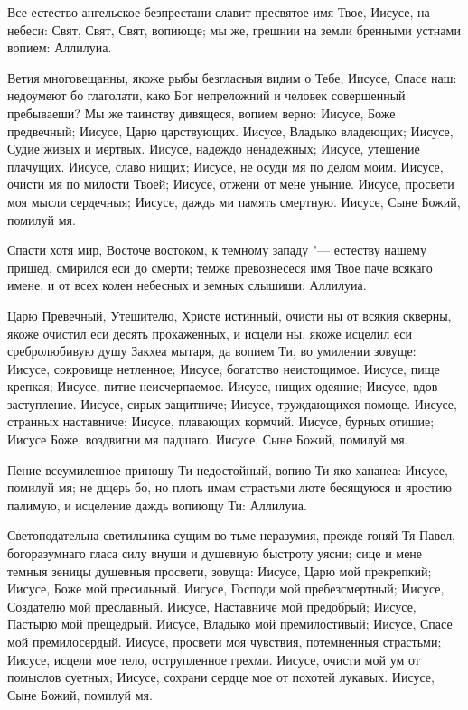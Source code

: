 \begin{mymulticols}

Все
естество ангельское безпрестани славит пресвятое имя Твое, Иисусе, на небеси: Свят, Свят, Свят, вопиюще; мы же, грешнии на земли бренными устнами вопием: Аллилуиа.


Ветия
многовещанны, якоже рыбы безгласныя видим о Тебе, Иисусе, Спасе наш: недоумеют бо глаголати, како Бог непреложний и человек совершенный пребываеши? Мы же таинству дивящеся, вопием верно: Иисусе, Боже предвечный; Иисусе, Царю царствующих. Иисусе, Владыко владеющих; Иисусе, Судие живых и мертвых. Иисусе, надеждо ненадежных; Иисусе, утешение плачущих. Иисусе, славо нищих; Иисусе, не осуди мя по делом моим. Иисусе, очисти мя по милости Твоей; Иисусе, отжени от мене уныние. Иисусе, просвети моя мысли сердечныя; Иисусе, даждь ми память смертную. Иисусе, Сыне Божий, помилуй мя.


Спасти
хотя мир, Восточе востоком, к темному западу "--- естеству нашему пришед, смирился еси до смерти; темже превознесеся имя Твое паче всякаго имене, и от всех колен небесных и земных слышиши: Аллилуиа.


Царю
Превечный, Утешителю, Христе истинный, очисти ны от всякия скверны, якоже очистил еси десять прокаженных, и исцели ны, якоже исцелил еси сребролюбивую душу Закхеа мытаря, да вопием Ти, во умилении зовуще: Иисусе, сокровище нетленное; Иисусе, богатство неистощимое. Иисусе, пище крепкая; Иисусе, питие неисчерпаемое. Иисусе, нищих одеяние; Иисусе, вдов заступление. Иисусе, сирых защитниче; Иисусе, труждающихся помоще. Иисусе, странных наставниче; Иисусе, плавающих кормчий. Иисусе, бурных отишие; Иисусе Боже, воздвигни мя падшаго. Иисусе, Сыне Божий, помилуй мя.


Пение
всеумиленное приношу Ти недостойный, вопию Ти яко хананеа: Иисусе, помилуй мя; не дщерь бо, но плоть имам страстьми люте бесящуюся и яростию палимую, и исцеление даждь вопиющу Ти: Аллилуиа.


Светоподательна
светильника сущим во тьме неразумия, прежде гоняй Тя Павел, богоразумнаго гласа силу внуши и душевную быстроту уясни; сице и мене темныя зеницы душевныя просвети, зовуща: Иисусе, Царю мой прекрепкий; Иисусе, Боже мой пресильный. Иисусе, Господи мой пребезсмертный; Иисусе, Создателю мой преславный. Иисусе, Наставниче мой предобрый; Иисусе, Пастырю мой прещедрый. Иисусе, Владыко мой премилостивый; Иисусе, Спасе мой премилосердый. Иисусе, просвети моя чувствия, потемненныя страстьми; Иисусе, исцели мое тело, острупленное грехми. Иисусе, очисти мой ум от помыслов суетных; Иисусе, сохрани сердце мое от похотей лукавых. Иисусе, Сыне Божий, помилуй мя.


\end{mymulticols}

